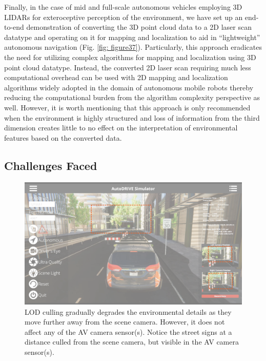 Finally, in the case of mid and full-scale autonomous vehicles employing 3D LIDARs for exteroceptive perception of the environment, we have set up an end-to-end demonstration of converting the 3D point cloud data to a 2D laser scan datatype and operating on it for mapping and localization to aid in ``lightweight'' autonomous navigation (Fig. \ref{fig: figure37}). Particularly, this approach eradicates the need for utilizing complex algorithms for mapping and localization using 3D point cloud datatype. Instead, the converted 2D laser scan requiring much less computational overhead can be used with 2D mapping and localization algorithms widely adopted in the domain of autonomous mobile robots thereby reducing the computational burden from the algorithm complexity perspective as well. However, it is worth mentioning that this approach is only recommended when the environment is highly structured and loss of information from the third dimension creates little to no effect on the interpretation of environmental features based on the converted data.

\hypertarget{Challenges Faced}{%
\subsection{Challenges Faced}\label{Challenges Faced}}

\begin{figure}[t]
    \centering
    \includegraphics[width=\linewidth]{Figures/fig38.png}
    \caption{LOD culling gradually degrades the environmental details as they move further away from the scene camera. However, it does not affect any of the AV camera sensor(s). Notice the street signs at a distance culled from the scene camera, but visible in the AV camera sensor(s).}
    \label{fig: figure38}
\end{figure}

